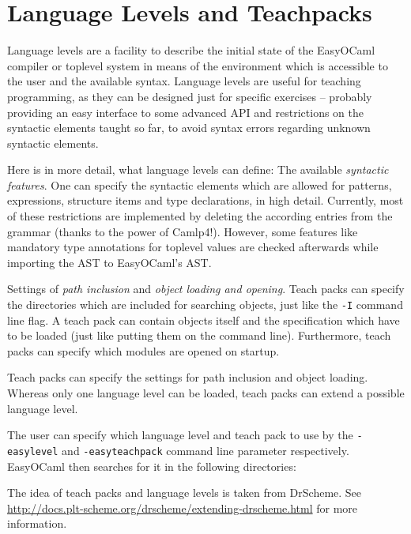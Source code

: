 
\section{Language Levels and Teachpacks}
\label{sec:teachpacks}

Language levels are a facility to describe the initial state of the 
EasyOCaml compiler or toplevel system in means of the environment which 
is accessible to the user and the available syntax.  Language levels are 
useful for teaching programming, as they can be designed just for 
specific exercises -- probably providing an easy interface to some 
advanced API and restrictions on the syntactic elements taught so far, 
to avoid syntax errors regarding unknown syntactic elements.

Here is in more detail, what language levels can define: The available 
\emph{syntactic features}.  One can specify the syntactic elements which 
are allowed for patterns, expressions, structure items and type 
declarations, in high detail. Currently, most of these restrictions are 
implemented by deleting the according entries from the grammar (thanks 
to the power of Camlp4!).  However, some features like mandatory type 
annotations for toplevel values are checked afterwards while importing 
the AST to EasyOCaml's AST.

Settings of \emph{path inclusion} and \emph{object loading and opening}.  
Teach packs can specify the directories which are included for searching 
objects, just like the \texttt{-I} command line flag.  A teach pack can 
contain objects itself and the specification which have to be loaded 
(just like putting them on the command line).  Furthermore, teach packs 
can specify which modules are opened on startup.

Teach packs can specify the settings for path inclusion and object 
loading. Whereas only one language level can be loaded, teach packs can 
extend a possible language level.

The user can specify which language level and teach pack to use by the 
\texttt{-easylevel} and \texttt{-easyteachpack} command line parameter 
respectively. EasyOCaml then searches for it in the following 
directories:


The idea of teach packs and language levels is taken from DrScheme.  See 
\href{http://docs.plt-scheme.org/drscheme/extending-drscheme.html}{http://docs.plt-scheme.org/drscheme/extending-drscheme.html}
for more information.



